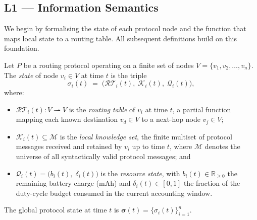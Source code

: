 
\subsection{L1 — Information Semantics}
\label{subsec:l1-semantics}

We begin by formalising the state of each protocol node and the function
that maps local state to a routing table.  All subsequent definitions
build on this foundation.

\begin{definition}
\label{def:node-state}
Let $P$ be a routing protocol operating on a finite set of nodes
$V = \{v_1, v_2, \ldots, v_n\}$.
The \emph{state} of node $v_i \in V$ at time $t$ is the triple
\[
  \sigma_i(t) \;=\; \bigl(\mathcal{RT}_i(t),\; \mathcal{K}_i(t),\; \mathcal{Q}_i(t)\bigr),
\]
where:
\begin{itemize}
  \item $\mathcal{RT}_i(t) : V \rightharpoonup V$ is the \emph{routing table} of $v_i$
        at time $t$, a partial function mapping each known destination
        $v_d \in V$ to a next-hop node $v_j \in V$;

  \item $\mathcal{K}_i(t) \subseteq \mathcal{M}$ is the \emph{local knowledge set},
        the finite multiset of protocol messages received and retained by $v_i$
        up to time $t$, where $\mathcal{M}$ denotes the universe of all
        syntactically valid protocol messages; and

  \item $\mathcal{Q}_i(t) = \bigl(b_i(t),\; \delta_i(t)\bigr)$ is the
        \emph{resource state}, with $b_i(t) \in \mathbb{R}_{\ge 0}$ the
        remaining battery charge (mAh) and
        $\delta_i(t) \in [0,1]$ the fraction of the duty-cycle budget
        consumed in the current accounting window.
\end{itemize}
The global protocol state at time $t$ is $\boldsymbol{\sigma}(t) = \{\sigma_i(t)\}_{i=1}^{n}$.
\end{definition}

